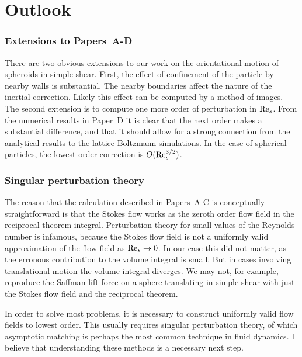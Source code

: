 \documentclass[thesis.tex]{subfiles}
\begin{document}
\section{Outlook}

\subsubsection{Extensions to Papers~A-D}

There are two obvious extensions to our work on the orientational motion of spheroids in simple shear. First, the effect of confinement of the particle by nearby walls is substantial. The nearby boundaries affect the nature of the inertial correction. Likely this effect can be computed by a method of images. The second extension is to compute one more order of perturbation in $\textrm{Re}_s$. From the numerical results in Paper~D it is clear that the next order makes a substantial difference, and that it should allow for a strong connection from the analytical results to the lattice Boltzmann simulations. In the case of spherical particles, the lowest order correction is $O(\textrm{Re}_s^{3/2})$.

\subsubsection{Singular perturbation theory}

The reason that the calculation described in Papers~A-C is conceptually straightforward is that the Stokes flow works as the zeroth order flow field in the reciprocal theorem integral. Perturbation theory for small values of the Reynolds number is infamous, because the Stokes flow field is not a uniformly valid approximation of the flow field as $\textrm{Re}_s\to0$. In our case this did not matter, as the erronous contribution to the volume integral is small. But in cases involving translational motion the volume integral diverges. We may not, for example, reproduce the Saffman lift force on a sphere translating in simple shear with just the Stokes flow field and the reciprocal theorem.

In order to solve most problems, it is necessary to construct uniformly valid flow fields to lowest order. This usually requires singular perturbation theory, of which asymptotic matching is perhaps the most common technique in fluid dynamics. I believe that understanding these methods is a necessary next step.
\end{document}

